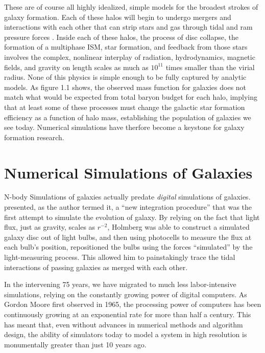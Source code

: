These are of course all highly idealized, simple models for the broadest strokes
of galaxy formation.  Each of these halos will begin to undergo mergers and
interactions \citet{Navarro1993,Kauffmann1999,Cole2000} with each other that can
strip stars and gas through tidal and ram pressure forces
\citep{Gunn1972,Dressler1980}.  Inside each of these halos, the process of disc
collapse, the formation of a multiphase ISM, star formation, and feedback from
those stars involves the complex, nonlinear interplay of radiation,
hydrodynamics, magnetic fields, and gravity on length scales as much as
$10^{11}$ times smaller than the virial radius.  None of this physics is simple
enough to be fully captured by analytic models. As figure 1.1 shows, the
observed mass function for galaxies does not match what would be expected from
total baryon budget for each halo, implying that at least some of these
processes must change the galactic star formation efficiency as a function of
halo mass, establishing the population of galaxies we see today.  Numerical
simulations have therfore become a keystone for galaxy formation research.


\section{Numerical Simulations of Galaxies}
N-body Simulations of galaxies actually predate {\it digital} simulations of
galaxies.  \citet{Holmberg1941} presented, as the author termed it, a ``new
integration procedure'' that was the first attempt to simulate the
evolution of galaxy.  By relying on the fact that light flux, just as gravity,
scales as $r^{-2}$, Holmberg was able to construct a simulated galaxy disc out
of light bulbs, and then using photocells to measure the flux at each bulb's
position, repositioned the bulbs using the forces ``simulated'' by the
light-measuring process.  This allowed him to painstakingly trace the tidal
interactions of passing galaxies as merged with each other.

In the intervening 75 years, we have migrated to much less labor-intensive
simulations, relying on the constantly growing power of digital computers.  As
Gordon Moore first observed in 1965, the processing power of computers has been
continuously growing at an exponential rate for more than half a century.  This
has meant that, even without advances in numerical methods and algorithm design,
the ability of simulators today to model a system in high resolution is
monumentally greater than just 10 years ago.  

